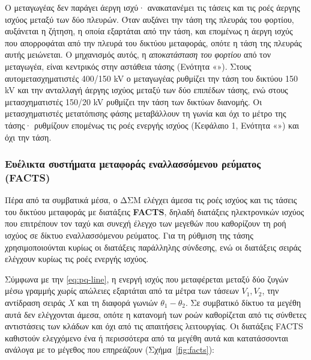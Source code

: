 Ο μεταγωγέας δεν παράγει άεργη ισχύ· ανακατανέμει τις τάσεις και τις ροές άεργης ισχύος
μεταξύ των δύο πλευρών. Όταν αυξάνει την τάση της πλευράς του φορτίου, αυξάνεται η ζήτηση, η
οποία εξαρτάται από την τάση, και επομένως η άεργη ισχύς που απορροφάται από την πλευρά του
δικτύου μεταφοράς, οπότε η τάση της πλευράς αυτής μειώνεται. Ο μηχανισμός αυτός, η
\emph{αποκατάσταση του φορτίου} από τον μεταγωγέα, είναι κεντρικός στην αστάθεια τάσης
(Ενότητα «»). Στους αυτομετασχηματιστές 400/150 kV ο μεταγωγέας
ρυθμίζει την τάση του δικτύου 150 kV και την ανταλλαγή άεργης ισχύος μεταξύ των δύο επιπέδων
τάσης, ενώ στους μετασχηματιστές 150/20 kV ρυθμίζει την τάση των δικτύων διανομής. Οι
μετασχηματιστές μετατόπισης φάσης μεταβάλλουν τη γωνία και όχι το μέτρο της τάσης· ρυθμίζουν
επομένως τις ροές ενεργής ισχύος (Κεφάλαιο 1, Ενότητα «») και όχι την τάση.

\subsubsection{Ευέλικτα συστήματα μεταφοράς εναλλασσόμενου ρεύματος (FACTS)}
\label{sec:facts}

Πέρα από τα συμβατικά μέσα, ο ΔΣΜ ελέγχει άμεσα τις ροές ισχύος και τις τάσεις του δικτύου
μεταφοράς με διατάξεις \textbf{FACTS}, δηλαδή διατάξεις ηλεκτρονικών ισχύος που επιτρέπουν τον
ταχύ και συνεχή έλεγχο των μεγεθών που καθορίζουν τη ροή ισχύος σε δίκτυο εναλλασσόμενου
ρεύματος. Για τη ρύθμιση της τάσης χρησιμοποιούνται κυρίως οι διατάξεις παράλληλης σύνδεσης,
ενώ οι διατάξεις σειράς ελέγχουν κυρίως τις ροές ενεργής ισχύος.

Σύμφωνα με την \eqref{eq:pq-line}, η ενεργή ισχύς που μεταφέρεται μεταξύ δύο ζυγών μέσω
γραμμής χωρίς απώλειες εξαρτάται από τα μέτρα των τάσεων $V_1, V_2$, την αντίδραση σειράς
$X$ και τη διαφορά γωνιών $\theta_1 - \theta_2$. Σε
συμβατικό δίκτυο τα μεγέθη αυτά δεν ελέγχονται άμεσα, οπότε η κατανομή των ροών καθορίζεται
από τις σύνθετες αντιστάσεις των κλάδων και όχι από τις απαιτήσεις λειτουργίας. Οι διατάξεις
FACTS καθιστούν ελεγχόμενο ένα ή περισσότερα από τα μεγέθη αυτά και κατατάσσονται ανάλογα με
το μέγεθος που επηρεάζουν (Σχήμα~\ref{fig:facts}):

